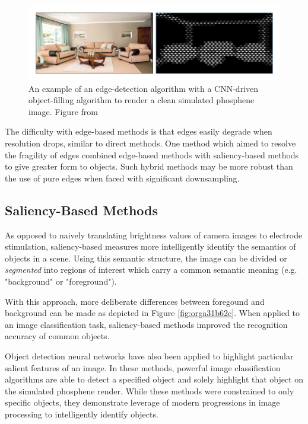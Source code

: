 \documentclass[a4paper,11pt,openany]{book}
\begin{document}
\begin{figure}[htbp]
\centering
\includegraphics[width=.9\linewidth]{./graphics/litreview/edgeandfill.png}
\caption[Example of using an edge-detection algorithm to render a clean simulated phosphene image]{\label{fig:orgd769a79}
An example of an edge-detection algorithm with a CNN-driven object-filling algorithm to render a clean simulated phosphene image. Figure from \cite{sanchez-garcia_structural_2018}}
\end{figure}

The difficulty with edge-based methods is that edges easily degrade when resolution drops, similar to direct methods. \cite{buffoni_image_2005}
One method which aimed to resolve the fragility of edges combined edge-based methods with saliency-based methods to give greater form to objects. \cite{han_object_2015}
Such hybrid methods may be more robust than the use of pure edges when faced with significant downsampling.

\subsection*{Saliency-Based Methods}
\label{sec:org5244d8f}

As opposed to naively translating brightness values of camera images to electrode stimulation, saliency-based measures more intelligently identify the semantics of objects in a scene.
Using this semantic structure, the image can be divided or \emph{segmented} into regions of interest which carry a common semantic meaning (e.g. "background" or "foreground"). \cite{pal_review_1993}

With this approach, more deliberate differences between foregound and background can be made as depicted in Figure \ref{fig:orga31b62c}. \cite{guo_optimization_2018}
When applied to an image classification task, saliency-based methods improved the recognition accuracy of common objects. \cite{han_object_2015,li_image_2018}

Object detection neural networks have also been applied to highlight particular salient features of an image. \cite{mace_simulated_2015}
In these methods, powerful image classification algorithms are able to detect a specified object and solely highlight that object on the simulated phosphene render.
While these methods were constrained to only specific objects, they demonstrate leverage of modern progressions in image processing to intelligently identify objects.
\end{document}

